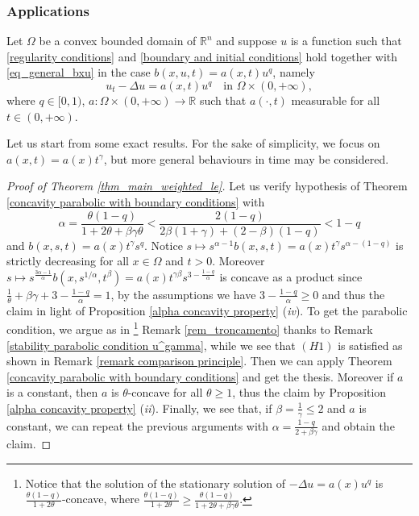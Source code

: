 \documentclass[11pt, reqno]{amsart}
\theoremstyle{definition}
\numberwithin{equation}{section}
\newcommand{\R}{\mathbb{R}}
\begin{document}
\subsubsection{Applications}

Let $\Omega$ be a convex bounded domain of $\R^n$ and suppose $u$ is a function such that \eqref{regularity conditions} and \eqref{boundary and initial conditions} hold together with \eqref{eq_general_bxu} in the case $b(x,u,t)=a(x,t) u^q$, namely 
\begin{equation}\label{equazione a(x)u^gamma}
	u_t-\Delta u=a(x,t)u^q \quad\text{in }\Omega\times (0,+\infty),
\end{equation}
where $q\in[0,1)$, $a\colon\Omega \times (0,+\infty)\to \R$  such that $a(\cdot,t)$ measurable for all $t\in(0,+\infty)$. 

\smallskip

Let us start from some exact results. For the sake of simplicity, we focus on $a(x,t)=a(x) t^{\gamma}$, but more general behaviours in time may be considered.
\begin{proof}[Proof of Theorem \ref{thm_main_weighted_le}]
Let us verify hypothesis of Theorem \ref{concavity parabolic with boundary conditions} with 
$$\alpha= \frac{\theta(1-q)}{1+2\theta +\beta \gamma \theta}<\frac{2(1-q)}{2\beta(1+\gamma)+(2-\beta)(1-q)}<1-q$$ and $b(x,s, t)=a(x) t^{\gamma} s^q$. Notice $s \mapsto s^{\alpha-1} b(x,s,t) = a(x) t^{\gamma} s^{\alpha-(1-q)}$
is strictly decreasing for all $x\in \Omega$ and $t>0$.
Moreover $s \mapsto s^{\frac{3\alpha -1}{\alpha}}b(x,s^{1/\alpha},t^{\beta})=a(x) t^{\gamma \beta} s^{3-\frac{1-q}{\alpha}} $
is concave as a product since $\frac{1}{\theta}+\beta \gamma + 3-\frac{1-q}{\alpha}=1$, by the assumptions we have $3-\frac{1-q}{\alpha}\geq 0$ and thus the claim in light of Proposition \ref{alpha concavity property} (\textit{iv}). 
To get the parabolic condition, we argue as in%
\footnote{Notice that the solution of the stationary solution of $-\Delta u = a(x) u^q$ is $\frac{\theta(1-q)}{1+2\theta}$-concave, where $\frac{\theta(1-q)}{1+2\theta}\geq \frac{\theta(1-q)}{1+2\theta +\beta \gamma \theta}$.} Remark \ref{rem_troncamento} thanks to Remark \ref{stability parabolic condition u^gamma}, while we see that \hyperlink{H1}{\( (H1) \)} is satisfied as shown in Remark \ref{remark comparison principle}. Then we can apply Theorem \ref{concavity parabolic with boundary conditions} and get the thesis.
Moreover if $a$ is a constant, then $a$ is $\theta$-concave for all $\theta\geq 1$, thus the claim by Proposition \ref{alpha concavity property} (\textit{ii}). 
Finally, we see that, if $\beta=\frac{1}{\gamma}\leq 2$ and $a$ is constant, we can repeat the previous arguments with $\alpha=\frac{1-q}{2+\beta \gamma }$ and obtain the claim.
\end{proof}
\end{document}
